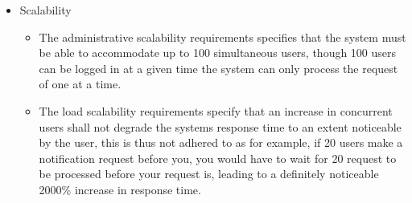 \begin{itemize}
\begin{itemize}
		\end{itemize}
	\item Scalability
		\begin{itemize}
			\item The administrative scalability requirements specifies that the system must be able to accommodate up to 100 						simultaneous users, though 100 users can be logged in at a given time the system can only process the request of 				one at a time.
			\item The load scalability requirements specify that an increase in concurrent users shall not degrade the systems 						response time to an extent noticeable by the user, this is thus not adhered to as for example, if 20 users make 					a notification request before you, you would have to wait for 20 request to be processed before your request is, 				leading to a definitely noticeable 2000\% increase in response time.
		\end{itemize}
\end{itemize}

